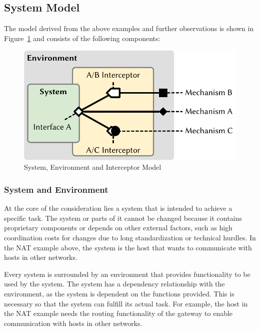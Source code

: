 \subsection{System Model}

The model derived from the above examples and further observations is shown in Figure~\ref{fig:model} and consists of the following components:
\begin{figure}
    \centering
    \includegraphics[width=.9\linewidth]{figures/model.pdf}
    \caption{System, Environment and Interceptor Model}
    \label{fig:model}
\end{figure}


\subsubsection{System and Environment}
At the core of the consideration lies a system that is intended to achieve a specific task.
The system or parts of it cannot be changed because it contains proprietary components or depends on other external factors, such as high coordination costs for changes due to long standardization or technical hurdles.
In the NAT example above, the system is the host that wants to communicate with hosts in other networks.

Every system is surrounded by an environment that provides functionality to be used by the system.
The system has a dependency relationship with the environment, as the system is dependent on the functions provided.
This is necessary so that the system can fulfill its actual task.
For example, the host in the NAT example needs the routing functionality of the gateway to enable communication with hosts in other networks.

